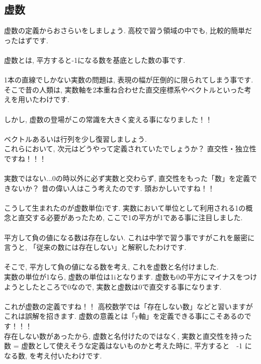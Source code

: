 \documentclass[11pt,a4paper]{jreport}
\begin{document}
\subsection{虚数}
虚数の定義からおさらいをしましょう. 高校で習う領域の中でも, 比較的簡単だったはずです.\\
\\
虚数とは, 平方すると-1になる数を基底とした数の事です.\\
\\
1本の直線でしかない実数の問題は, 表現の幅が圧倒的に限られてしまう事です. そこで昔の人類は, 実数軸を2本重ね合わせた直交座標系やベクトルといった考えを用いたわけです.\\
\\
しかし, 虚数の登場がこの常識を大きく変える事になりました！！\\
\\
ベクトルあるいは行列を少し復習しましょう.\\
これらにおいて, 次元はどうやって定義されていたでしょうか？ 直交性・独立性ですね！！！\\
\\
実数ではない...0の時以外に必ず実数と交わらず, 直交性をもった「数」を定義できないか？
昔の偉い人はこう考えたのです. 頭おかしいですね！！\\
\\
こうして生まれたのが虚数単位iです. 実数において単位として利用される1の概念と直交する必要があったため, ここで1の平方が1である事に注目しました. \\
\\
平方して負の値になる数は存在しない. これは中学で習う事ですがこれを厳密に言うと, 「従来の数には存在しない」と解釈したわけです.\\
\\
そこで, 平方して負の値になる数を考え, これを虚数と名付けました.\\
実数の単位が1なら, 虚数の単位は1iとなります. 虚数も0の平方にマイナスをつけようとしたところで0なので, 実数と虚数は0で直交する事になります.\\
\\
これが虚数の定義ですね！！ 高校数学では「存在しない数」などと習いますがこれは誤解を招きます. 虚数の意義とは「y軸」を定義できる事にこそあるのです！！！\\
存在しない数があったから, 虚数と名付けたのではなく, 実数と直交性を持った数 = 虚数として使えそうな定義はないものかと考えた時に, 平方すると　-1 になる数, を考え付いたわけです.
\end{document}
